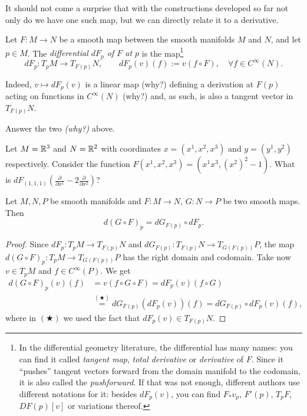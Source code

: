 It should not come a surprise that with the constructions developed so far not only do we have one such map, but we can directly relate it to a derivative.

\begin{definition}\label{def:differentialMap}
	Let $F: M \to N$ be a smooth map between the smooth manifolds $M$ and $N$, and let $p\in M$.
	The \emph{differential $d F_p$ of $F$ at $p$} is the map\footnote{In the differential geometry literature, the differential has many names: you can find it called \emph{tangent map}, \emph{total derivative} or \emph{derivative} of $F$.
		Since it ``pushes'' tangent vectors forward from the domain manifold to the codomain, it is also called the \emph{pushforward}. If that was not enough, different authors use different notations for it: besides $dF_p(v)$, you can find $F_* v_p$, $F'(p)$, $T_pF$, $DF(p)[v]$ or variations thereof.}
	\begin{equation}
		d F_p : T_p M \to T_{F(p)} N, \qquad d F_p (v) (f) := v(f\circ F), \quad \forall f\in C^\infty(N).
	\end{equation}
\end{definition}

Indeed, $v \mapsto d F_p (v)$ is a linear map (why?) defining a derivation at $F(p)$ acting on functions in $C^\infty(N)$ (why?) and, as such, is also a tangent vector in $T_{F(p)}N$.

\begin{exercise}
	Answer the two \emph{(why?)} above.
\end{exercise}
\begin{exercise}
	Let $M = \mathbb{R}^3$ and $N = \mathbb{R}^2$ with coordinates $x=(x^1,x^2,x^3)$ and $y=(y^1,y^2)$ respectively.
	Consider the function $F(x^1,x^2,x^3) = (x^1 x^3, (x^2)^2-1)$.
	What is $d F_{(1,1,1)} \left(\frac{\partial}{\partial x^1} - 2 \frac{\partial}{\partial x^2}\right)$?
\end{exercise}

\begin{theorem}\label{thm:chainrule_mfld}
	Let $M, N, P$ be smooth manifolds and $F: M \to N$, $G: N\to P$ be two smooth maps. Then
	\begin{equation}
		d(G\circ F)_p = dG_{F(p)} \circ dF_p.
	\end{equation}
\end{theorem}
\begin{proof}
	Since $dF_p : T_p M \to T_{F(p)}N$ and $dG_{F(p)}: T_{F(p)}N \to T_{G(F(p))}P$, the map $d(G\circ F)_p: T_p M \to T_{G(F(p))}P$ has the right domain and codomain.
	Take now $v\in T_p M$ and $f\in C^\infty(P)$. We get
	\begin{align}
		d(G\circ F)_p(v)(f) & = v(f\circ G \circ F)
		= dF_p (v)(f\circ G)                                                  \\
		                    & \stackrel{(\bigstar)}{=} dG_{F(p)}(dF_p (v))(f)
		= dG_{F(p)} \circ dF_p (v)(f),
	\end{align}
	where in $(\bigstar)$ we used the fact that $dF_p (v)\in T_{F(p)}N$.
\end{proof}

